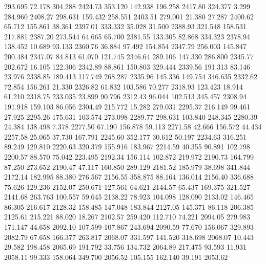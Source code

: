  293.695   72.178  304.288      2424.73
 353.120  142.938  196.258      2417.80
 324.377    3.299  284.960      2408.27
 298.631  159.432  258.551      2403.51
 279.001   21.380   27.287      2400.62
  65.712  155.861   38.361      2397.01
 333.332   35.028   31.500      2388.93
 321.548  158.531  217.881      2387.20
 273.544   64.665   65.700      2381.55
 133.305   82.868  334.323      2378.94
 138.452   10.689   93.133      2360.76
  36.884   97.492  154.854      2347.79
 256.003  145.847  200.484      2347.07
  84.813   61.070  121.745      2346.64
 289.106  147.330  286.800      2345.77
 202.672   16.105  122.306      2342.89
  88.861  150.803  329.444      2339.56
 191.313   83.146   23.976      2338.85
 189.413  117.749  268.287      2335.96
 145.336  149.754  346.635      2332.62
  72.854  156.261   21.330      2326.82
  61.832  103.586   70.277      2318.93
 123.423   18.914   61.210      2318.75
 233.035   23.899   90.796      2312.43
  96.044  102.513  345.457      2308.94
 191.918  159.103   86.056      2304.49
 215.772   15.282  279.031      2295.37
 216.149   99.461   27.925      2295.26
 175.631  103.574  273.098      2289.77
 298.631  103.840  248.345      2280.39
  24.384  138.498    7.378      2277.50
  67.190  156.878   59.113      2271.58
  42.666  156.572   44.434      2257.58
  25.065   37.730  167.791      2245.60
 352.177   30.612   50.197      2234.63
 316.251   89.249  129.810      2220.63
 320.379  155.916  183.967      2214.59
  40.355   90.891  102.798      2200.57
  88.570   75.042  223.495      2192.34
 156.114  102.872  219.972      2190.73
 164.799   87.250  273.652      2190.47
  47.117  160.850  289.129      2181.52
 185.979   38.698  341.844      2172.14
 182.995   88.380  276.567      2156.55
 358.875   88.164  136.014      2156.40
 336.688   75.626  129.236      2152.07
 250.671  127.561   64.621      2144.57
  65.437  169.375  321.527      2141.68
 263.763  100.557   59.645      2138.22
  78.923  104.098  128.090      2133.02
 146.465   86.305  216.617      2128.32
 158.485  147.048  183.844      2127.05
 145.371   86.118  206.385      2125.61
 215.221   88.020   18.267      2102.57
 259.420  112.710   74.221      2094.05
 279.983  171.147   44.658      2092.10
 107.599  107.867  243.694      2090.59
  77.670  156.067  329.893      2082.79
  67.658  166.377  263.817      2068.07
 331.597  141.520  318.698      2068.07
  10.443   29.582  198.458      2065.69
 191.792   33.756  134.732      2064.89
 217.475   93.593   11.931      2058.11
  99.333  158.064  349.700      2056.52
 105.155  162.140   39.191      2053.62
